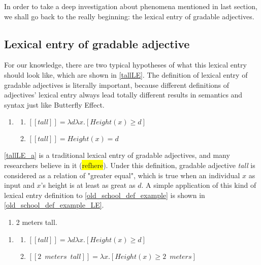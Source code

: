 \documentclass{ctexart}
\begin{document}
In order to take a deep investigation about phenomena mentioned in last section, we shall go back to the really beginning: the lexical entry of gradable adjectives. 

\subsection{Lexical entry of gradable adjective}

For our knowledge, there are two typical hypotheses of what this lexical entry should look like, which are shown in \ref{tallLE}. The definition of lexical entry of gradable adjectives is literally important, because different definitions of adjectives' lexical entry always lead totally different results in semantics and syntax just like Butterfly Effect.

\begin{enumerate}[resume]
    \item \label{tallLE}
    
    \begin{enumerate}[ref=(\arabic{enumi}\alph*)]
        \item \label{tallLE_a} 
        $[\![tall]\!]=\lambda d \lambda x.[Height(x) \geq d]$
    
        \item \label{tallLE_b} 
        $[\![tall]\!]=Height(x)=d$
    
    \end{enumerate}
\end{enumerate}

\ref{tallLE_a} is a traditional lexical entry of gradable adjectives, and many researchers believe in it (\colorbox{yellow}{refhere}). Under this definition, gradable adjective \textit{tall} is considered as a relation of "greater equal", which is true when an individual $x$ as input and $x$'s height is at least as great as $d$. A simple application of this kind of lexical entry definition to \ref{old_school_def_example} is shown in \ref{old_school_def_example_LE}.

\begin{enumerate}[resume]

    \item \label{old_school_def_example} 2 meters tall.

\end{enumerate}

\begin{enumerate}[resume]

    \item \label{old_school_def_example_LE}
    
    \begin{enumerate}[ref=(\arabic{enumi}\alph*)]
        
        \item $[\![tall]\!]=\lambda d \lambda x.[Height(x) \geq d]$
        \item $[\![2 \enspace meters \enspace tall]\!]=\lambda x.[Height(x) \geq 2 \enspace meters]$

    \end{enumerate}

\end{enumerate}
\end{document}

